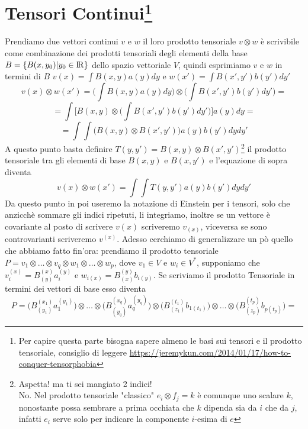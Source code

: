 \documentclass[11pt,a4paper]{report}
\theoremstyle{definition}
\theoremstyle{plain}
\theoremstyle{plain}
\begin{document}
		\section{Tensori Continui\protect\footnote{Per capire questa parte bisogna sapere almeno le basi sui tensori e il prodotto tensoriale, consiglio di leggere \href{url}{https://jeremykun.com/2014/01/17/how-to-conquer-tensorphobia}}}
			Prendiamo due vettori continui $v$ e $w$ il loro prodotto tensoriale $v\otimes w$ è scrivibile come combinazione dei prodotti tensoriali degli elementi della base $B=\{B(x,y_0)|y_0\in \rm I\!R\}$ dello spazio vettoriale $V$, quindi esprimiamo $v$ e $w$ in termini di $B$ $v(x)=\int B(x,y)a(y)dy$ e $w(x')=\int B(x',y')b(y')dy'$
			\[
				v(x)\otimes w(x')=\bigg(\int B(x,y)a(y)dy \bigg)\otimes \bigg(\int B(x',y')b(y')dy'\bigg)=
			\]
			\[
				=\int \bigg[B(x,y)\otimes\bigg(\int B(x',y')b(y')dy'\bigg)\bigg]a(y)dy=
			\]
			\[
				=\int \int \bigg(B(x,y)\otimes B(x',y')\bigg)a(y)b(y')dydy'
			\]
			A questo punto basta definire $T(y,y')=B(x,y)\otimes B(x',y')$\footnote{Aspetta! ma ti sei mangiato 2 indici!\\ No. Nel prodotto tensoriale "classico" $e_i\otimes f_j=k$ è comunque uno scalare $k$, nonostante possa sembrare a prima occhiata che $k$ dipenda sia da $i$ che da $j$, infatti $e_i$ serve solo per indicare la componente $i$-esima di $e$} il prodotto tensoriale tra gli elementi di base $B(x,y)$ e $B(x,y')$ e l'equazione di sopra diventa
			\begin{equation}
				v(x)\otimes w(x')=\int \int T(y,y')a(y)b(y')dydy'
			\end{equation}
			Da questo punto in poi useremo la notazione di Einstein per i tensori, solo che anzicchè sommare gli indici ripetuti, li integriamo, inoltre se un vettore è covariante al posto di scrivere $v(x)$ scriveremo $v_{(x)}$, viceversa se sono controvarianti scriveremo $v^{(x)}$.\newline
			Adesso cerchiamo di generalizzare un pò quello che abbiamo fatto fin'ora: prendiamo il prodotto tensoriale $P=v_1\otimes\dots\otimes v_q\otimes w_1\otimes\dots\otimes w_p$, dove $v_1\in V$ e $w_i\in V^*$, supponiamo che $v_i^{(x)}=B^{(x)}_{(y)}a_i^{(y)}$ e $w_{i(x)}=B_{(x)}^{(y)}b_{i(y)}$.\newline
			Se scriviamo il prodotto Tensoriale in termini dei vettori di base esso diventa
			\[
				P=\Big(B^{(x_1)}_{(y_1)}a_1^{(y_1)}\Big)\otimes\dots\otimes\Big(B^{(x_q)}_{(y_q)}a_q^{(y_q)}\Big)\otimes\Big(B_{(z_1)}^{(t_1)}b_{1(t_1)}\Big)\otimes\dots\otimes\Big(B_{(z_p)}^{(t_p)}b_{p(t_p)}\Big)=
			\]
\end{document}
